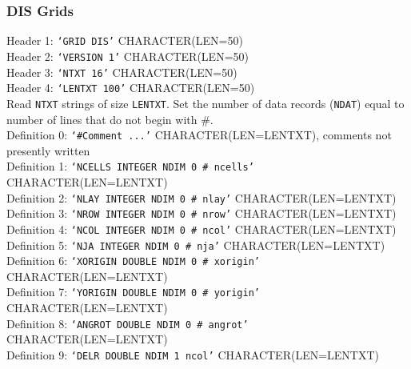 \newpage
\subsubsection{DIS Grids}

\vspace{5mm}
\noindent Header 1: \texttt{`GRID DIS'}  {\color{red} \footnotesize{CHARACTER(LEN=50)}} \\
\noindent Header 2: \texttt{`VERSION 1'}  {\color{red} \footnotesize{CHARACTER(LEN=50)}} \\
\noindent Header 3: \texttt{`NTXT 16'} {\color{red} \footnotesize{CHARACTER(LEN=50)}}\\
\noindent Header 4: \texttt{`LENTXT 100'} {\color{red} \footnotesize{CHARACTER(LEN=50)}}\\

\vspace{5mm}
\noindent Read \texttt{NTXT} strings of size \texttt{LENTXT}. Set the number of data records (\texttt{NDAT}) equal to number of lines that do not begin with \#.  \\
\noindent Definition 0: \texttt{`\#Comment ...'} {\color{red} \footnotesize{CHARACTER(LEN=LENTXT)}, comments not presently written} \\
\noindent Definition 1: \texttt{`NCELLS INTEGER NDIM 0 \# ncells'} {\color{red} \footnotesize{CHARACTER(LEN=LENTXT)}} \\
\noindent Definition 2: \texttt{`NLAY INTEGER NDIM 0 \# nlay'} {\color{red} \footnotesize{CHARACTER(LEN=LENTXT)}} \\
\noindent Definition 3: \texttt{`NROW INTEGER NDIM 0 \# nrow'} {\color{red} \footnotesize{CHARACTER(LEN=LENTXT)}} \\
\noindent Definition 4: \texttt{`NCOL INTEGER NDIM 0 \# ncol'} {\color{red} \footnotesize{CHARACTER(LEN=LENTXT)}} \\
\noindent Definition 5: \texttt{`NJA INTEGER NDIM 0 \# nja'} {\color{red} \footnotesize{CHARACTER(LEN=LENTXT)}} \\
\noindent Definition 6: \texttt{`XORIGIN DOUBLE NDIM 0 \# xorigin'} {\color{red} \footnotesize{CHARACTER(LEN=LENTXT)}} \\
\noindent Definition 7: \texttt{`YORIGIN DOUBLE NDIM 0 \# yorigin'} {\color{red} \footnotesize{CHARACTER(LEN=LENTXT)}} \\
\noindent Definition 8: \texttt{`ANGROT DOUBLE NDIM 0 \# angrot'} {\color{red} \footnotesize{CHARACTER(LEN=LENTXT)}} \\
\noindent Definition 9: \texttt{`DELR DOUBLE NDIM 1 ncol'} {\color{red} \footnotesize{CHARACTER(LEN=LENTXT)}} \\
